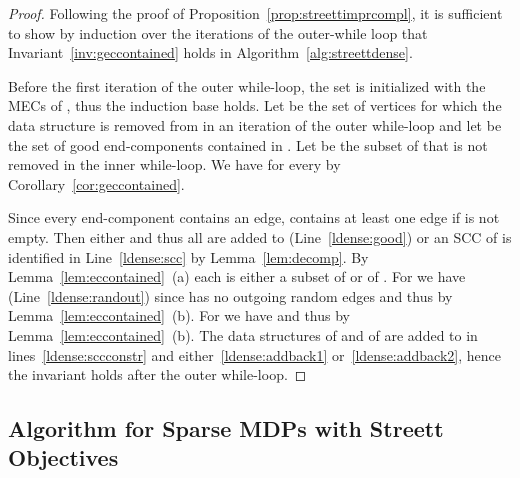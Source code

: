 \documentclass[11pt,letterpaper]{article}
\newcommand{\lu}{\textup{(}}
\newcommand{\ru}{\textup{)}\xspace}
\newcommand{\upbr}[1]{\lu #1\ru}
\begin{document}
\begin{proof}
	Following the proof of Proposition~\ref{prop:streettimprcompl}, it is sufficient
	to show by induction over the iterations of the outer-while loop that Invariant~\ref{inv:geccontained} holds in Algorithm~\ref{alg:streettdense}. 
	
	Before the first iteration of the outer while-loop, the 
	set  is initialized with the MECs of , thus the induction base holds.
	Let  be the set of vertices for which the data structure is 
	removed from  in an iteration of the outer while-loop and 
	let  be the set of good end-components 
	contained in . 
	Let  be the subset of  that is not removed in the inner while-loop.
	We have  for every  by
	Corollary~\ref{cor:geccontained}.
	
	Since every end-component contains an edge,  contains at least one
	edge if  is not empty. 
	Then either  and thus all  are added to 
	(Line~\ref{ldense:good}) or an SCC  of  is 
	identified in Line~\ref{ldense:scc} by Lemma~\ref{lem:decomp}. By 
	Lemma~\ref{lem:eccontained}~\upbr{a} each  is either
	a subset of  or of .
	For  we have  (Line~\ref{ldense:randout})
	since  has no outgoing random edges and thus  by Lemma~\ref{lem:eccontained}~\upbr{b}.
	For  we have 
	and thus 
	by Lemma~\ref{lem:eccontained}~\upbr{b}.	
	The data structures of 
	and of 
	are added to  in lines~\ref{ldense:sccconstr} and either~\ref{ldense:addback1}
	or~\ref{ldense:addback2}, hence the invariant holds after the outer while-loop.
\end{proof}

\subsection{Algorithm for Sparse MDPs with Streett Objectives}\label{sec:streettsparse}
\end{document}
